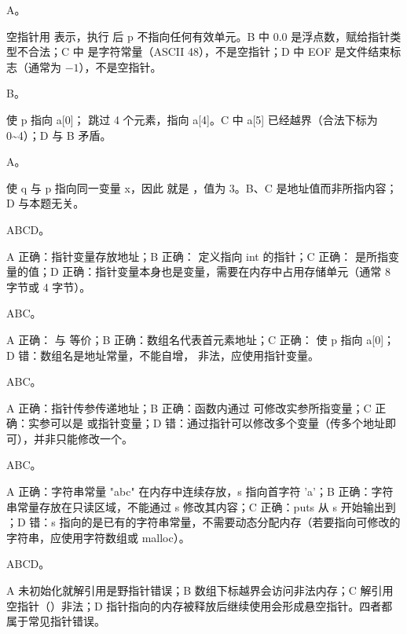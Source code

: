 \documentclass[a4paper,11pt]{article}
\begin{document}
\q A。\begin{analysis}空指针用  表示，执行  后 p 不指向任何有效单元。B 中 0.0 是浮点数，赋给指针类型不合法；C 中  是字符常量（ASCII 48），不是空指针；D 中 EOF 是文件结束标志（通常为 $-1$），不是空指针。\end{analysis}

\q B。\begin{analysis} 使 p 指向 a[0]； 跳过 4 个元素，指向 a[4]。C 中 a[5] 已经越界（合法下标为 0\textasciitilde 4）；D 与 B 矛盾。\end{analysis}

\q A。\begin{analysis} 使 q 与 p 指向同一变量 x，因此  就是 ，值为 3。B、C 是地址值而非所指内容；D 与本题无关。\end{analysis}


\q ABCD。\begin{analysis}A 正确：指针变量存放地址；B 正确： 定义指向 int 的指针；C 正确： 是所指变量的值；D 正确：指针变量本身也是变量，需要在内存中占用存储单元（通常 8 字节或 4 字节）。\end{analysis}

\q ABC。\begin{analysis}A 正确： 与  等价；B 正确：数组名代表首元素地址；C 正确： 使 p 指向 a[0]；D 错：数组名是地址常量，不能自增， 非法，应使用指针变量。\end{analysis}

\q ABC。\begin{analysis}A 正确：指针传参传递地址；B 正确：函数内通过  可修改实参所指变量；C 正确：实参可以是  或指针变量；D 错：通过指针可以修改多个变量（传多个地址即可），并非只能修改一个。\end{analysis}

\q ABC。\begin{analysis}A 正确：字符串常量 "abc" 在内存中连续存放，s 指向首字符 'a'；B 正确：字符串常量存放在只读区域，不能通过 s 修改其内容；C 正确：puts 从 s 开始输出到 ；D 错：s 指向的是已有的字符串常量，不需要动态分配内存（若要指向可修改的字符串，应使用字符数组或 malloc）。\end{analysis}

\q ABCD。\begin{analysis}A 未初始化就解引用是野指针错误；B 数组下标越界会访问非法内存；C 解引用空指针（）非法；D 指针指向的内存被释放后继续使用会形成悬空指针。四者都属于常见指针错误。\end{analysis}
\end{document}
